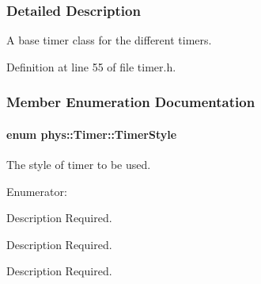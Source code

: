 \subsubsection{Detailed Description}
A base timer class for the different timers. 

Definition at line 55 of file timer.h.



\subsubsection{Member Enumeration Documentation}
\hypertarget{classphys_1_1Timer_a1ee86bf43e20329d750c5d582dcce329}{
\paragraph[{TimerStyle}]{\setlength{\rightskip}{0pt plus 5cm}enum {\bf phys::Timer::TimerStyle}}\hfill}
\label{d3/d83/classphys_1_1Timer_a1ee86bf43e20329d750c5d582dcce329}


The style of timer to be used. 

\begin{Desc}
\item[Enumerator: ]\par
\begin{description}
\item[{\em 
\hypertarget{classphys_1_1Timer_a1ee86bf43e20329d750c5d582dcce329a5debd5b8437d14405bf25cd9b130449f}{
Normal}
\label{d3/d83/classphys_1_1Timer_a1ee86bf43e20329d750c5d582dcce329a5debd5b8437d14405bf25cd9b130449f}
}]Description Required. \item[{\em 
\hypertarget{classphys_1_1Timer_a1ee86bf43e20329d750c5d582dcce329a7599daa63100c2134df7d8b7c9b7f867}{
StopWatch}
\label{d3/d83/classphys_1_1Timer_a1ee86bf43e20329d750c5d582dcce329a7599daa63100c2134df7d8b7c9b7f867}
}]Description Required. \item[{\em 
\hypertarget{classphys_1_1Timer_a1ee86bf43e20329d750c5d582dcce329ae9b9fa35767e4ac2c87c078e1d9a0729}{
Alarm}
\label{d3/d83/classphys_1_1Timer_a1ee86bf43e20329d750c5d582dcce329ae9b9fa35767e4ac2c87c078e1d9a0729}
}]Description Required. \end{description}
\end{Desc}




